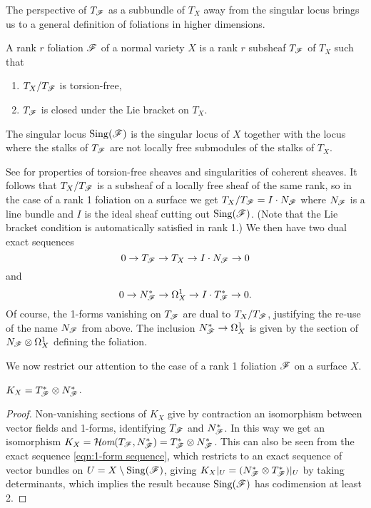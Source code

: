 The perspective of $T_{\mathscr{F}}$ as a subbundle of $T_X$ away from the singular
locus brings us to a general definition of foliations in higher dimensions.

\begin{definition}
    A rank $r$ foliation $\mathscr{F}$ of a normal variety $X$ is a rank $r$ subsheaf
    $T_{\mathscr{F}}$ of $T_X$ such that
    \begin{enumerate}[label=\roman*.]
        \item $T_X/T_{\mathscr{F}}$ is torsion-free,
        \item $T_{\mathscr{F}}$ is closed under the Lie bracket on $T_X$.
    \end{enumerate}
    The singular locus $\operatorname{Sing}(\mathscr{F})$ is the singular locus of $X$ together with
    the locus where the stalks of $T_{\mathscr{F}}$ are not locally free submodules of
    the stalks of $T_X$.
\end{definition}

See \cite[\S2]{friedman_book} for properties of torsion-free sheaves and
singularities of coherent sheaves. It follows that $T_X/T_{\mathscr{F}}$ is a subsheaf
of a locally free sheaf of the same rank, so in the case of a rank 1 foliation
on a surface we get $T_X/T_{\mathscr{F}}=I\cdot N_{\mathscr{F}}$ where $N_{\mathscr{F}}$ is a line
bundle and $I$ is the ideal sheaf cutting out $\operatorname{Sing}(\mathscr{F})$. (Note that the Lie
bracket condition is automatically satisfied in rank 1.) We then have two dual
exact sequences
\begin{equation}\label{eqn:tangent sequence}
    0 \to T_{\mathscr{F}} \to T_X \to I\cdot N_{\mathscr{F}} \to 0
\end{equation}
and
\begin{equation}\label{eqn:1-form sequence}
    0 \to N_{\mathscr{F}}^* \to \Omega^1_X \to I\cdot T_{\mathscr{F}}^* \to 0.
\end{equation}
Of course, the 1-forms vanishing on $T_{\mathscr{F}}$ are dual to $T_X/T_{\mathscr{F}}$,
justifying the re-use of the name $N_{\mathscr{F}}$ from above. The inclusion
$N_{\mathscr{F}}^*\to\Omega^1_X$ is given by the section of $N_{\mathscr{F}}\otimes\Omega^1_X$
defining the foliation.

We now restrict our attention to the case of a rank 1 foliation $\mathscr{F}$ on a
surface $X$.

\begin{proposition}\label{prop:canonical}
    $K_X=T_{\mathscr{F}}^*\otimes N_{\mathscr{F}}^*$.
\end{proposition}

\begin{proof}
    Non-vanishing sections of $K_X$ give by contraction an isomorphism between
    vector fields and 1-forms, identifying $T_{\mathscr{F}}$ and $N_{\mathscr{F}}^*$. In this
    way we get an isomorphism
    $K_X=\operatorname{\mathcal{H}\kern -1pt \textit{om}}(T_{\mathscr{F}},N_{\mathscr{F}}^*)=T_{\mathscr{F}}^*\otimes N_{\mathscr{F}}^*$. This can also be
    seen from the exact sequence \eqref{eqn:1-form sequence}, which restricts to
    an exact sequence of vector bundles on $U=X\setminus\operatorname{Sing}(\mathscr{F})$, giving
    $K_X|_U=(N_{\mathscr{F}}^*\otimes T_{\mathscr{F}}^*)|_U$ by taking determinants, which
    implies the result because $\operatorname{Sing}(\mathscr{F})$ has codimension at least 2.
\end{proof}

